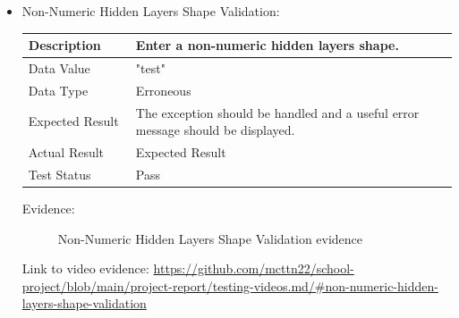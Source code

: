 \documentclass[./project-report/src/latex/project-report.tex]{subfiles}
\begin{document}
\begin{itemize}
	\item Non-Numeric Hidden Layers Shape Validation: \newline\newline
		\begin{tabular}{|p{0.25\linewidth}|p{0.75\linewidth}|}
			\hline
			Description & Enter a non-numeric hidden layers shape. \\
			\hline
			Data Value & "test" \\
			\hline
			Data Type & Erroneous \\
			\hline
			Expected Result & The exception should be handled and a useful error message should be displayed. \\
			\hline
			Actual Result & Expected Result \\
			\hline
			Test Status & Pass \\
			\hline
		\end{tabular}

		\vspace{5mm}

		Evidence:
		\begin{figure}[h!]
		\centering
		\caption{Non-Numeric Hidden Layers Shape Validation evidence}
		\end{figure}

		\begin{sloppypar}
		Link to video evidence: \url{https://github.com/mcttn22/school-project/blob/main/project-report/testing-videos.md/#non-numeric-hidden-layers-shape-validation}
		\end{sloppypar}


\end{itemize}
\end{document}
